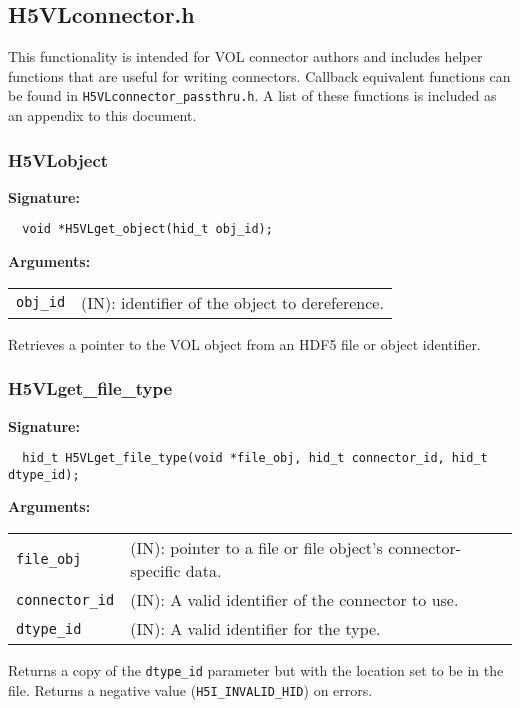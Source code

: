 \subsection{H5VLconnector.h}

This functionality is intended for VOL connector authors and includes helper
functions that are useful for writing connectors. Callback equivalent
functions can be found in {\tt H5VLconnector\_passthru.h}. A list of these
functions is included as an appendix to this document.

\subsubsection{H5VLobject}
\begin{mdframed}[style=bgbox]
\textbf{Signature:}
\begin{lstlisting}
  void *H5VLget_object(hid_t obj_id); 
\end{lstlisting}

\textbf{Arguments:}\\
\begin{tabular}{l p{13.5cm}}
 {\tt obj\_id} & (IN): identifier of the object to dereference.\\
\end{tabular}
\end{mdframed}
Retrieves a pointer to the VOL object from an HDF5 file or object identifier.\bigskip

\subsubsection{H5VLget\_file\_type}
\begin{mdframed}[style=bgbox]
\textbf{Signature:}
\begin{lstlisting}
  hid_t H5VLget_file_type(void *file_obj, hid_t connector_id, hid_t dtype_id); 
\end{lstlisting}

\textbf{Arguments:}\\
\begin{tabular}{l p{13.5cm}}
 {\tt file\_obj} & (IN): pointer to a file or file object's connector-specific data.\\
 {\tt connector\_id} & (IN): A valid identifier of the connector to use.\\
 {\tt dtype\_id} & (IN): A valid identifier for the type.\\
\end{tabular}
\end{mdframed}
Returns a copy of the {\tt dtype\_id} parameter but with the location set to
be in the file. Returns a negative value ({\tt H5I\_INVALID\_HID}) on errors.\bigskip


